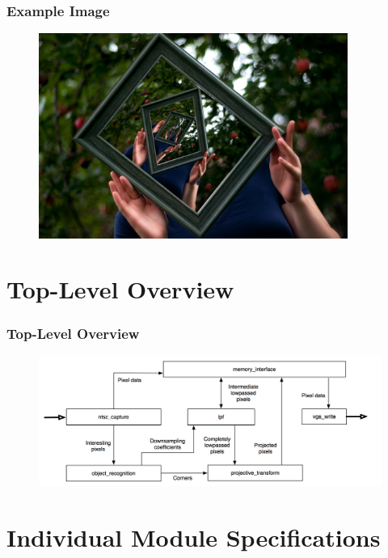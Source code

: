 \documentclass{beamer}
\begin{document}
\begin{frame}
	\frametitle{Example Image}
	\begin{figure}
		\centering
		\includegraphics[width=0.9\textwidth]{example3.jpg}
	\end{figure}
\end{frame}

\section{Top-Level Overview}
\begin{frame}
	\frametitle{Top-Level Overview}
	\begin{figure}
		\centering
		\includegraphics[width=\textwidth]{../proposal/simplified_block_diagram.png}
	\end{figure}
\end{frame}

\section{Individual Module Specifications}
\end{document}
